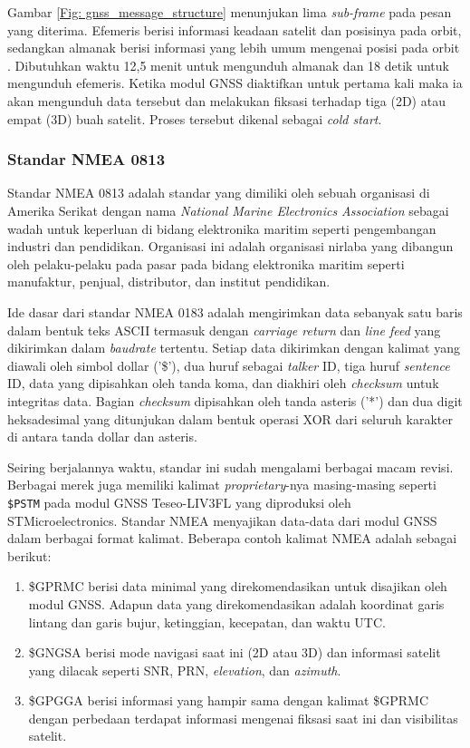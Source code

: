 Gambar \ref{Fig: gnss_message_structure} menunjukan lima \textit{sub-frame} pada pesan yang diterima. Efemeris berisi informasi keadaan satelit dan posisinya pada orbit, sedangkan almanak berisi informasi yang lebih umum mengenai posisi pada orbit \cite{Lenhart2022}. Dibutuhkan waktu 12,5 menit untuk mengunduh almanak dan 18 detik untuk mengunduh efemeris. Ketika modul GNSS diaktifkan untuk pertama kali maka ia akan mengunduh data tersebut dan melakukan fiksasi terhadap tiga (2D) atau empat (3D) buah satelit. Proses tersebut dikenal sebagai \textit{cold start}. 

\subsubsection{Standar NMEA 0813}
Standar NMEA 0813 adalah standar yang dimiliki oleh sebuah organisasi di Amerika Serikat dengan nama \textit{National Marine Electronics Association} sebagai wadah untuk keperluan di bidang elektronika maritim seperti pengembangan industri dan pendidikan. Organisasi ini adalah organisasi nirlaba yang dibangun oleh pelaku-pelaku pada pasar pada bidang elektronika maritim seperti manufaktur, penjual, distributor, dan institut pendidikan.

Ide dasar dari standar NMEA 0183 adalah mengirimkan data sebanyak satu baris dalam bentuk teks ASCII termasuk dengan \textit{carriage return} dan \textit{line feed} yang dikirimkan dalam \textit{baudrate} tertentu. Setiap data dikirimkan dengan kalimat yang diawali oleh simbol dollar ('\$'), dua huruf sebagai \textit{talker} ID, tiga huruf \textit{sentence} ID, data yang dipisahkan oleh tanda koma, dan diakhiri oleh \textit{checksum} untuk integritas data. Bagian \textit{checksum} dipisahkan oleh tanda asteris ('*') dan dua digit heksadesimal yang ditunjukan dalam bentuk operasi XOR dari seluruh karakter di antara tanda dollar dan asteris.

Seiring berjalannya waktu, standar ini sudah mengalami berbagai macam revisi. Berbagai merek juga memiliki kalimat \textit{proprietary}-nya masing-masing seperti \texttt{\$PSTM} pada modul GNSS Teseo\hyp{}LIV3FL yang diproduksi oleh STMicroelectronics. Standar NMEA menyajikan data-data dari modul GNSS dalam berbagai format kalimat. Beberapa contoh kalimat NMEA adalah sebagai berikut:
\begin{enumerate}
	\item \$GPRMC berisi data minimal yang direkomendasikan untuk disajikan oleh modul GNSS. Adapun data yang direkomendasikan adalah koordinat garis lintang dan garis bujur, ketinggian, kecepatan, dan waktu UTC.
	\item \$GNGSA berisi mode navigasi saat ini (2D atau 3D) dan informasi satelit yang dilacak seperti SNR, PRN, \textit{elevation}, dan \textit{azimuth}.
	\item \$GPGGA berisi informasi yang hampir sama dengan kalimat \$GPRMC dengan perbedaan terdapat informasi mengenai fiksasi saat ini dan visibilitas satelit.
\end{enumerate}

